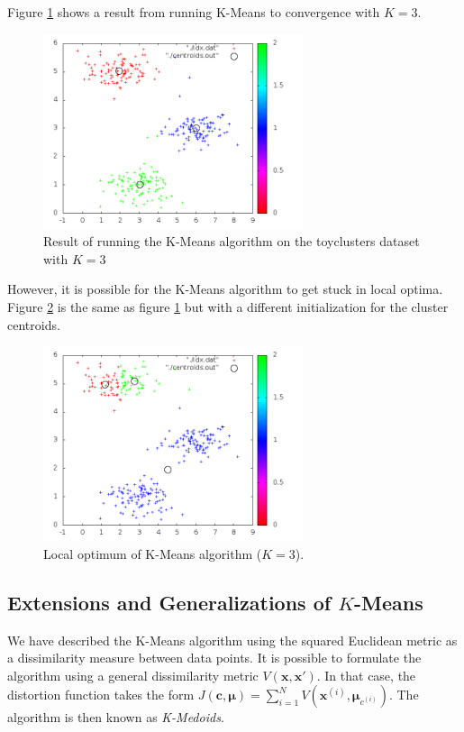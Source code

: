 \documentclass[final,3p,times,twocolumn]{elsarticle}
\begin{document}
Figure \ref{fig:kmeans1} shows a result from running K-Means to convergence with $K = 3$.
\begin{figure}
\centering
\includegraphics[width=3in]{kmeans1.png}
\caption{Result of running the K-Means algorithm on the toyclusters dataset with $K=3$}
\label{fig:kmeans1}
\end{figure}

However, it is possible for the K-Means algorithm to get stuck in local optima.
Figure \ref{fig:kmeans2} is the same as figure \ref{fig:kmeans1} but with a different initialization for the cluster centroids. 
\begin{figure}
\centering
\includegraphics[width=3in]{kmeans2.png}
\caption{Local optimum of K-Means algorithm ($K=3$).}
\label{fig:kmeans2}
\end{figure}

\subsection{Extensions and Generalizations of $K$-Means}
We have described the K-Means algorithm using the squared Euclidean metric as a dissimilarity measure between data points.
It is possible to formulate the algorithm using a general dissimilarity metric $V(\boldsymbol x, \boldsymbol x')$.
In that case, the distortion function takes the form $J(\boldsymbol c, \boldsymbol \mu) = \sum_{i=1}^N V(\boldsymbol x^{(i)}, \boldsymbol \mu_{c^{(i)}})$.
The algorithm is then known as \emph{K-Medoids}.
\end{document}
